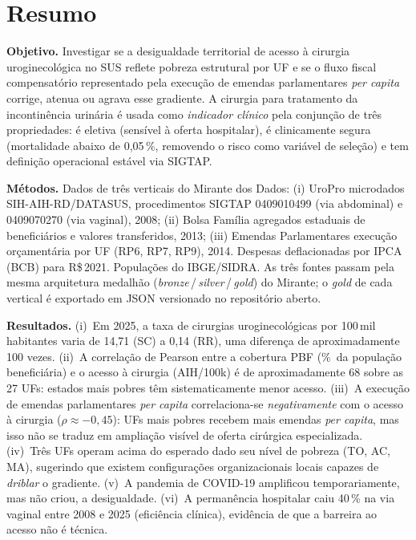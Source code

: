 \documentclass[12pt,a4paper,oneside]{article}
\newcommand{\rs}{R\$\,}
\begin{document}
\section*{Resumo}
\begin{singlespace}\small\noindent
\textbf{Objetivo.} Investigar se a desigualdade territorial de
acesso à cirurgia uroginecológica no SUS reflete pobreza
estrutural por UF e se o fluxo fiscal compensatório
\textemdash{} representado pela execução de emendas parlamentares
\textit{per capita} \textemdash{} corrige, atenua ou agrava esse
gradiente. A cirurgia para tratamento da incontinência urinária
é usada como \textit{indicador clínico} pela conjunção de três
propriedades: é eletiva (sensível à oferta hospitalar), é
clinicamente segura (mortalidade abaixo de 0{,}05\,\%, removendo
o risco como variável de seleção) e tem definição operacional
estável via SIGTAP.

\textbf{Métodos.} Dados de três verticais do Mirante dos Dados:
(i) UroPro \textemdash{} microdados SIH-AIH-RD/DATASUS,
procedimentos SIGTAP 0409010499 (via abdominal) e 0409070270
(via vaginal), 2008; (ii) Bolsa Família \textemdash{}
agregados estaduais de beneficiários e valores transferidos,
2013; (iii) Emendas Parlamentares \textemdash{}
execução orçamentária por UF (RP6, RP7, RP9), 2014.
Despesas deflacionadas por IPCA (BCB) para \rs 2021. Populações
do IBGE/SIDRA. As três fontes passam pela mesma arquitetura
medalhão (\textit{bronze}\,/\,\textit{silver}\,/\,\textit{gold})
do Mirante; o \textit{gold} de cada vertical é exportado em
JSON versionado no repositório aberto.

\textbf{Resultados.} (i)~Em 2025, a taxa de cirurgias
uroginecológicas por 100\,mil habitantes varia de 14{,}71 (SC)
a 0{,}14 (RR), uma diferença de aproximadamente 100 vezes.
(ii)~A correlação de Pearson entre a cobertura PBF
(\%~da população beneficiária) e o acesso à cirurgia (AIH/100k)
é de aproximadamente 68 sobre as 27 UFs:
estados mais pobres têm sistematicamente menor acesso.
(iii)~A execução de emendas parlamentares \textit{per capita}
correlaciona-se \textit{negativamente} com o acesso à cirurgia
($\rho \approx -0{,}45$): UFs mais pobres recebem mais emendas
\textit{per capita}, mas isso não se traduz em ampliação visível
de oferta cirúrgica especializada. (iv)~Três UFs operam acima
do esperado dado seu nível de pobreza (TO, AC, MA), sugerindo
que existem configurações organizacionais locais capazes de
\textit{driblar} o gradiente. (v)~A pandemia de COVID-19
amplificou temporariamente, mas não criou, a desigualdade.
(vi)~A permanência hospitalar caiu 40\,\% na via vaginal entre
2008 e 2025 (eficiência clínica), evidência de que a barreira
ao acesso não é técnica.


\end{singlespace}
\end{document}
